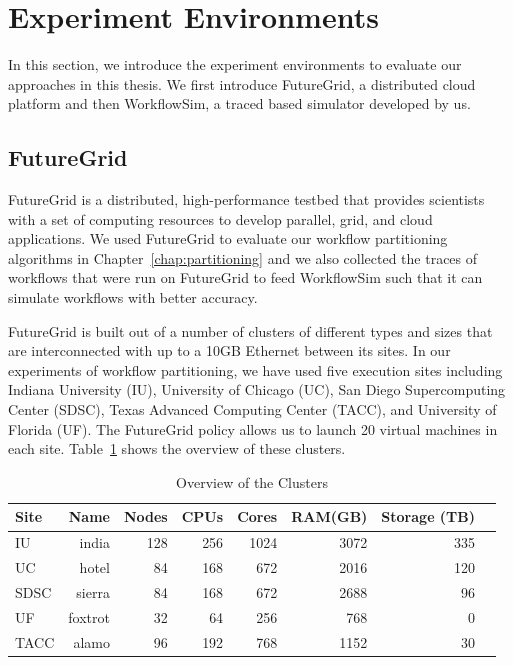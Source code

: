\section{Experiment Environments}
\label{sec:experiments}

In this section, we introduce the experiment environments to evaluate our approaches in this thesis. We first introduce FutureGrid, a distributed cloud platform and then WorkflowSim, a traced based simulator developed by us. 

\subsection{FutureGrid}
FutureGrid \cite{Fox2013FutureGrid} is a distributed, high-performance testbed that provides scientists with a set of computing resources to develop parallel, grid, and cloud applications. We used FutureGrid to evaluate our workflow partitioning algorithms in Chapter~\ref{chap:partitioning} and we also collected the traces of workflows that were run on FutureGrid to feed WorkflowSim such that it can simulate workflows with better accuracy. 

FutureGrid is built out of a number of clusters of different types and sizes that are interconnected with up to a 10GB Ethernet between its sites. In our experiments of workflow partitioning, we have used five execution sites including Indiana University (IU), University of Chicago (UC), San Diego Supercomputing Center (SDSC), Texas Advanced Computing Center (TACC), and University of Florida (UF). The FutureGrid policy allows us to launch 20 virtual machines in each site. Table~\ref{tab:model_clusters} shows the overview of these clusters. 

\begin{table}[h!]
\caption{Overview of the Clusters}
\label{tab:model_clusters}
\centering
\begin{tabular}{lrrrrrrr}
\hline
Site &  Name &  Nodes & CPUs & Cores &  RAM(GB) & Storage (TB)     \\\hline
IU & india & 128 & 256 & 1024 & 3072 & 335 \\
UC & hotel & 84 & 168 & 672 & 2016 & 120 \\
SDSC & sierra & 84 & 168 & 672 & 2688 & 96 \\
UF & foxtrot & 32 & 64 & 256 & 768 & 0 \\
TACC & alamo & 96 & 192 & 768 & 1152 & 30 \\\hline
\end{tabular}
\end{table} 



